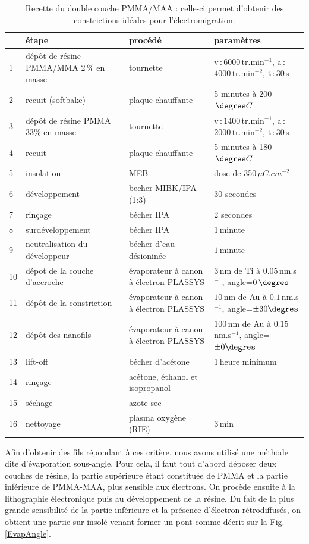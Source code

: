 \begin{table}
\begin{center}
\begin{tabular}{|p{0.5cm}|p{4cm}|p{4cm}|p{3cm}|}
  \hline
\,& \textbf{étape} & \textbf{procédé} & \textbf{paramètres} \tabularnewline
\hline
1 &  dép\^ot de résine PMMA/MMA 2\,\% en masse & tournette & v\,:\,$6000\,$tr.min$^{-1}$, a\,:\,$4000\,$tr.min$^{-2}$, t\,:\,$30\,$s 
\tabularnewline
\hline
 2 & recuit (softbake) & plaque chauffante  & 5 minutes à 200$\, \degres C$ 
\tabularnewline
\hline
 3 & dépôt de résine PMMA 33\% en masse & tournette & v\,:\,$1400\,$tr.min$^{-1}$, a\,:\,$2000\,$tr.min$^{-2}$, t\,:\,$30\,$s \tabularnewline
\hline
4 & recuit & plaque chauffante & 5 minutes à 180$\, \degres C$
\tabularnewline
\hline
5 & insolation & MEB & dose de 350\,$\mu C.cm^{-2}$
\tabularnewline
\hline
6 & développement & becher MIBK/IPA (1:3) & 30 secondes
\tabularnewline
\hline
7 & rinçage & bécher IPA & 2 secondes
\tabularnewline
\hline
8 & surdéveloppement & bécher IPA & 1\,minute
\tabularnewline
\hline
9 & neutralisation du développeur &bécher d'eau désioninée & $1\,$minute\tabularnewline
\hline
10 & dépot de la couche d'accroche & évaporateur à canon à électron PLASSYS & $3\,$nm de Ti à $0.05\,$nm.s$^{-1}$, angle=$0\,\degres$
\tabularnewline
\hline
11 & dépôt de la constriction & évaporateur à canon à électron PLASSYS & $10\,$nm de Au à $0.1\,$nm.s$^{-1}$, angle=$\pm 30\degres$
\tabularnewline
\hline
12 &  dépôt des nanofils &  évaporateur à canon à électron PLASSYS  &  $100\,$nm de Au à $0.15\,$nm.s$^{-1}$, angle=$\pm 0\degres$
\tabularnewline
\hline
 13 & lift-off & bécher d'acétone & 1\,heure minimum 
\tabularnewline
\hline
14 & rinçage & acétone, éthanol et isopropanol & 
\tabularnewline
\hline
15 & séchage & azote sec & 
\tabularnewline
\hline
16 & nettoyage & plasma oxygène (RIE)& $3\,$min\tabularnewline
\hline
\end{tabular}
\caption{Recette du double couche PMMA/MAA : celle-ci permet d'obtenir des constrictions idéales pour l'électromigration.}
\label{tab_recette_elec}
\end{center}
\end{table}


Afin d'obtenir des fils répondant à ces critère, nous avons utilisé une méthode dite d'évaporation sous-angle. Pour cela, il faut tout d'abord déposer deux couches de résine, la partie supérieure étant constituée de PMMA et la partie inférieure de PMMA-MAA, plus sensible aux électrons. On procède ensuite à la lithographie électronique puis au développement de la résine. Du fait de la plus grande sensibilité de la partie inférieure et la présence d'électron rétrodiffusés, on obtient une partie sur-insolé venant former un pont comme décrit sur la Fig.\ref{EvapAngle}.

